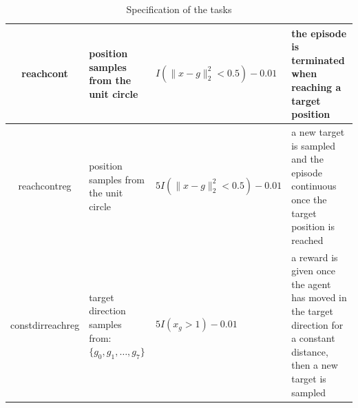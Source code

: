 \begin{table}[!htbp]
\begin{center}
\begin{tabular}{|c|p{3cm}|p{4cm}|p{4cm}|}
reachcont & position samples from the unit circle & $I(\lVert x-g\rVert_2^2<0.5) - 0.01$  & the episode is terminated when reaching a target position\\ \hline
reachcontreg & position samples from the unit circle & $5I(\lVert x-g\rVert_2^2<0.5) - 0.01$  & a new target is sampled and the episode continuous once the target position is reached\\ \hline
constdirreachreg & target direction samples from: $\{g_0,g_1, \dots,g_7\}$ & $5I(x_g > 1) - 0.01$  & a reward is given once the agent has moved in the target direction for a constant distance, then a new target is sampled\\ \hline
\end{tabular}
\end{center}
 \caption{Specification of the tasks}
\end{table}\label{table_ant_envs}
